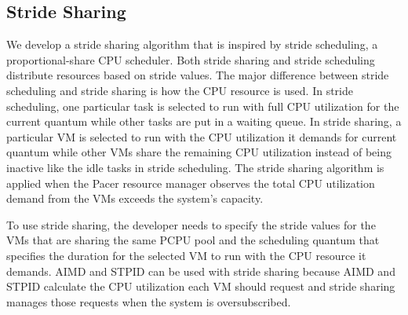 \subsection{Stride Sharing}
We develop a stride sharing algorithm that is inspired by stride scheduling\cite{stride}, a proportional-share CPU scheduler. Both stride sharing and stride scheduling distribute resources based on stride values. The major difference between stride scheduling and stride sharing is how the CPU resource is used. In stride scheduling, one particular task is selected to run with full CPU utilization for the current quantum while other tasks are put in a waiting queue. In stride sharing, a particular VM is selected to run with the CPU utilization it demands for current quantum while other VMs share the remaining CPU utilization instead of being inactive like the idle tasks in stride scheduling. The stride sharing algorithm is applied when the Pacer resource manager observes the total CPU utilization demand from the VMs exceeds the system's capacity. 

To use stride sharing, the developer needs to specify the stride values for the VMs that are sharing the same PCPU pool and the scheduling quantum that specifies the duration for the selected VM to run with the CPU resource it demands. AIMD and STPID can be used with stride sharing because AIMD and STPID calculate the CPU utilization each VM should request and stride sharing manages those requests when the system is oversubscribed.




